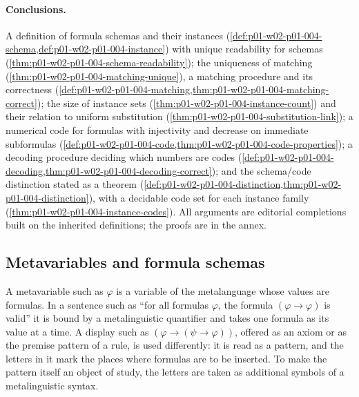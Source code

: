 \paragraph{Conclusions.} A definition of formula schemas and their instances
(\cref{def:p01-w02-p01-004-schema,def:p01-w02-p01-004-instance}) with unique
readability for schemas (\cref{thm:p01-w02-p01-004-schema-readability}); the
uniqueness of matching (\cref{thm:p01-w02-p01-004-matching-unique}), a
matching procedure and its correctness
(\cref{def:p01-w02-p01-004-matching,thm:p01-w02-p01-004-matching-correct});
the size of instance sets (\cref{thm:p01-w02-p01-004-instance-count}) and their
relation to uniform substitution
(\cref{thm:p01-w02-p01-004-substitution-link}); a numerical code for
formulas with injectivity and decrease on immediate subformulas
(\cref{def:p01-w02-p01-004-code,thm:p01-w02-p01-004-code-properties}); a
decoding procedure deciding which numbers are codes
(\cref{def:p01-w02-p01-004-decoding,thm:p01-w02-p01-004-decoding-correct});
and the schema/code distinction stated as a theorem
(\cref{def:p01-w02-p01-004-distinction,thm:p01-w02-p01-004-distinction}),
with a decidable code set for each instance family
(\cref{thm:p01-w02-p01-004-instance-codes}). All arguments are editorial
completions built on the inherited definitions; the proofs are in the annex.

\subsection{Metavariables and formula schemas}
\label{sec:p01-w02-p01-004-schemas}

A metavariable such as \(\varphi\) is a variable of the metalanguage whose
values are formulas. In a sentence such as ``for all formulas \(\varphi\),
the formula \((\varphi\to\varphi)\) is valid'' it is bound by a metalinguistic
quantifier and takes one formula as its value at a time. A display such as
\((\varphi\to(\psi\to\varphi))\), offered as an axiom or as the premise
pattern of a rule, is used differently: it is read as a pattern, and the
letters in it mark the places where formulas are to be inserted. To make the
pattern itself an object of study, the letters are taken as additional
symbols of a metalinguistic syntax.

